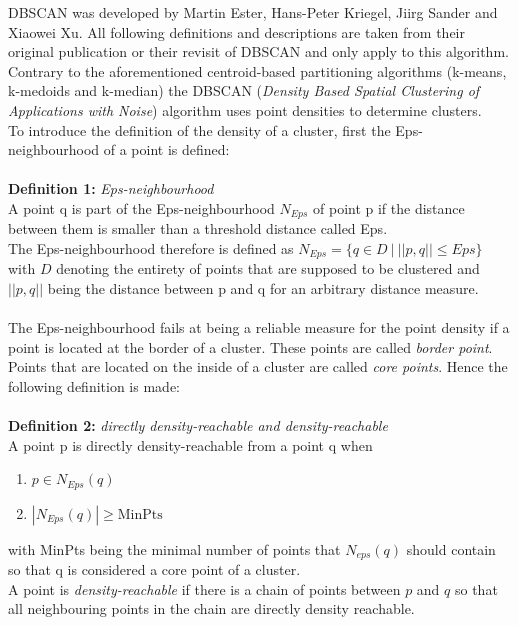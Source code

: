 DBSCAN was developed by Martin Ester, Hans-Peter Kriegel, Jiirg Sander and Xiaowei Xu. All following definitions and descriptions are taken from their original publication \cite{dbscan} or their revisit of DBSCAN \cite{dbscanrevisited} and only apply to this algorithm.\\
Contrary to the aforementioned centroid-based partitioning algorithms (k-means, k-medoids and k-median) the DBSCAN (\textit{Density Based Spatial Clustering of Applications with Noise}) algorithm uses point densities to determine clusters.\\
To introduce the definition of the density of a cluster, first the Eps-neighbourhood of a point is defined:\\
\ \\
\textbf{Definition 1:} \textit{Eps-neighbourhood}\\
A point q is part of the Eps-neighbourhood $N_{Eps}$ of point p if the distance between them is smaller than a threshold distance called Eps.\\
The Eps-neighbourhood therefore is defined as $N_{Eps} = \{q \in D \ | \ ||p, q|| \leq Eps \}$ with $D$ denoting the entirety of points that are supposed to be clustered and $||p, q||$ being the distance between p and q for an arbitrary distance measure.\\
\ \\
The Eps-neighbourhood fails at being a reliable measure for the point density if a point is located at the border of a cluster. These points are called \textit{border point}. Points that are located on the inside of a cluster are called \textit{core points}. Hence the following definition is made:\\
\ \\
\textbf{Definition 2:} \textit{directly density-reachable and density-reachable}\\
A point p is directly density-reachable from a point q when
\begin{enumerate}
    \item $p \in N_{Eps}(q)$
    \item $|N_{Eps}(q)| \geq \text{MinPts}$
\end{enumerate}
with MinPts being the minimal number of points that $N_{eps}(q)$ should contain so that q is considered a core point of a cluster.\\
A point is \textit{density-reachable} if there is a chain of points between $p$ and $q$ so that all neighbouring points in the chain are directly density reachable.\\
